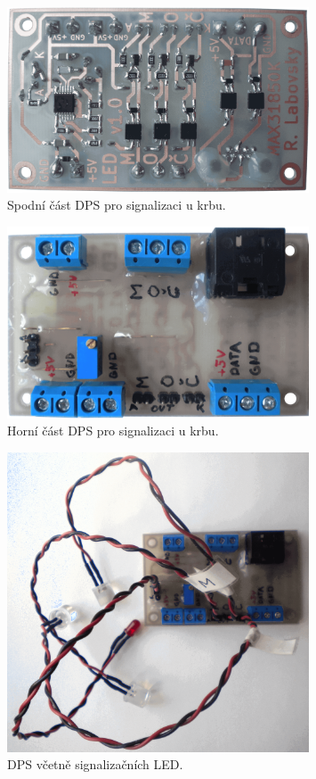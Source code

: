 \begin{figure}[H]
    \centering
    \includegraphics[width=0.8\textwidth]{images/krb/dps-led-ochrany-u-krbu-spodek.png}
    \caption{Spodní část DPS pro signalizaci u krbu.}
    \label{fig:dps-led-ochrany-u-krbu-spodek}
\end{figure}

\begin{figure}[H]
    \centering
    \includegraphics[width=0.8\textwidth]{images/krb/dps-led-ochrany-u-krbu-vrsek.png}
    \caption{Horní část DPS pro signalizaci u krbu.}
    \label{fig:dps-led-ochrany-u-krbu-vrsek}
\end{figure}

\begin{figure}[H]
    \centering
    \includegraphics[width=0.8\textwidth]{images/krb/dps-led-ochrany-u-krbu-kabely.png}
    \caption{DPS včetně signalizačních LED.}
    \label{fig:dps-led-ochrany-u-krbu-kabely}
\end{figure}


